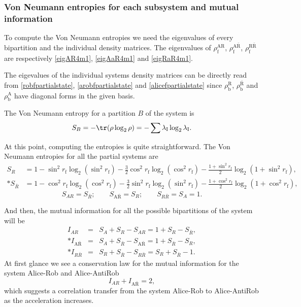 \subsubsection{Von Neumann entropies for each subsystem and mutual information}

To compute the Von Neumann entropies we need the eigenvalues of every bipartition and the individual density matrices. The eigenvalues of $\rho^\text{AR}_\text{f}$, $\rho^{\text{A}{\bar{\text{R}}}}_\text{f}$, $\rho^{\text{R}{\bar{\text{R}}}}_\text{f}$ are respectively \eqref{eigAR4m1}, \eqref{eigAaR4m1} and \eqref{eigRaR4m1}.

The eigevalues of the individual systems density matrices can be directly read from \eqref{robfpartialstate}, \eqref{arobfpartialstate} and \eqref{alicefpartialstate} since $\rho^\text{R}_\text{b}$, $\rho^{{\bar{\text{R}}}}_\text{b}$ and $\rho^\text{A}_\text{b}$ have diagonal forms in the given basis.

The Von Neumann entropy for a partition $B$ of the system is
\begin{equation}\label{Vonneu}
S_B=-\tr(\rho\log_2 \rho)=-\sum \lambda_\text{I}\log_2\lambda_\text{I}.
\end{equation}

At this point, computing the entropies is quite straightforward. The Von Neumann entropies for all the partial systems are
\begin{align}
\nonumber S_R&=1-\sin^2r_\text{f}\log_2(\sin^2r_\text{f})-\frac32\cos^2r_\text{f}\log_2(\cos^2r_\text{f})-\frac{1+\sin^2r_\text{f}}{2}\log_2(1+\sin^2r_\text{f}),\\*
\nonumber S_{\bar R}&=1-\cos^2r_\text{f}\log_2(\cos^2r_\text{f})-\frac32\sin^2r_\text{f}\log_2(\sin^2r_\text{f})-\frac{1+\cos^2r_\text{f}}{2}\log_2(1+\cos^2r_\text{f}),
\end{align}
\begin{equation}
 S_{AR}=S_{\bar R}; \qquad S_{\text{A}{\bar{\text{R}}}}=S_{R}; \qquad S_{R\bar R}=S_{A}=1.
 \end{equation}


And then, the mutual information for all the possible bipartitions of the system will be
\begin{eqnarray}
\nonumber I_{AR}&=&S_A+S_R-S_{A R}=1+S_R -S_{\bar R},\\*
\nonumber I_{\text{A}{\bar{\text{R}}}}&=&S_A+S_{\bar R}-S_{\text{A}{\bar{\text{R}}}}=1+ S_{\bar R}-S_R,\\*
\nonumber I_{R\bar R}&=& S_R+S_{\bar R}-S_{R\bar R}=S_R+S_{\bar R}-1.
\end{eqnarray}  
At first glance we see a conservation law for the mutual information for the system Alice-Rob and Alice-AntiRob
\begin{equation}\label{conservation1}
 I_{AR} + I_{\text{A}{\bar{\text{R}}}}=2,
\end{equation}
which suggests a correlation transfer from the system Alice-Rob to Alice-AntiRob as the acceleration increases.

